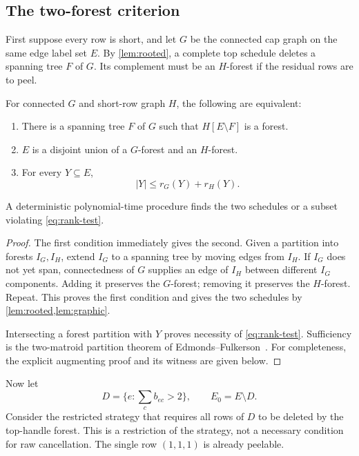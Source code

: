 \subsection{The two-forest criterion}

First suppose every row is short, and let $G$ be the connected cap graph on
the same edge label set $E$. By \cref{lem:rooted}, a complete top schedule
deletes a spanning tree $F$ of $G$. Its complement must be an $H$-forest if
the residual rows are to peel.

\begin{theorem}
\label{thm:joint}
For connected $G$ and short-row graph $H$, the following are equivalent:
\begin{enumerate}
\item There is a spanning tree $F$ of $G$ such that $H[E\setminus F]$ is
a forest.
\item $E$ is a disjoint union of a $G$-forest and an $H$-forest.
\item For every $Y\subseteq E$,
\begin{equation}
 |Y|\leq r_G(Y)+r_H(Y).
 \label{eq:rank-test}
\end{equation}
\end{enumerate}
A deterministic polynomial-time procedure finds the two schedules or a
subset violating \eqref{eq:rank-test}.
\end{theorem}

\begin{proof}
The first condition immediately gives the second. Given a partition into
forests $I_G,I_H$, extend $I_G$ to a spanning tree by moving edges from
$I_H$. If $I_G$ does not yet span, connectedness of $G$ supplies an edge of
$I_H$ between different $I_G$ components. Adding it preserves the
$G$-forest; removing it preserves the $H$-forest. Repeat. This proves the
first condition and gives the two schedules by \cref{lem:rooted,lem:graphic}.

Intersecting a forest partition with $Y$ proves necessity of
\eqref{eq:rank-test}. Sufficiency is the two-matroid partition theorem of
Edmonds--Fulkerson~\cite[Theorem 1c]{edmondsfulkerson}. For completeness,
the explicit augmenting proof and its witness are given below.
\end{proof}

Now let
\[
 D=\{e:\textstyle\sum_c b_{ec}>2\},\qquad E_0=E\setminus D.
\]
Consider the restricted strategy that requires all rows of $D$ to be
deleted by the top-handle forest. This is a restriction of the strategy,
not a necessary condition for raw cancellation. The single row $(1,1,1)$
is already peelable.

